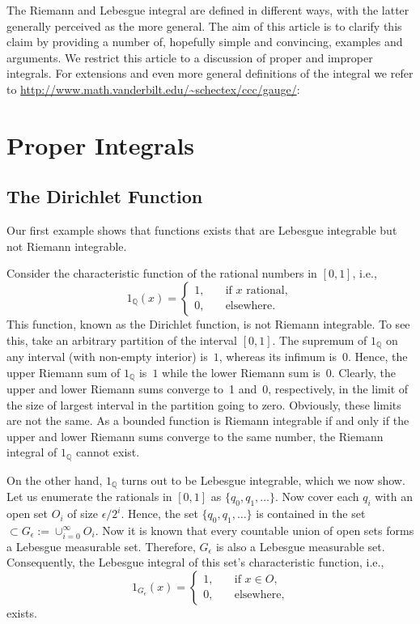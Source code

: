 \documentclass[12pt]{article}
\newcommand{\1}{{{\bf 1}}}
\begin{document}
The Riemann and Lebesgue integral are defined in different ways, with
the latter generally perceived as the more general.  The aim of 
this article is to clarify this claim by providing a number of,
hopefully simple and convincing, examples and arguments. We restrict
this article to a discussion of proper and improper integrals. For
extensions and even more general definitions of the integral we refer
to  \url{http://www.math.vanderbilt.edu/~schectex/ccc/gauge/}:

\section{Proper Integrals}
\label{sec:some-examples}

\subsection*{The Dirichlet Function}
\label{sec:example-1}
Our first example shows that functions exists that are Lebesgue
integrable but not Riemann integrable.

Consider the characteristic function of the rational numbers in
$[0,1]$, i.e.,
\begin{equation*}
  1_{\mathbb{Q}} (x) = 
  \begin{cases}
    1, &\quad \text{if $x$ rational}, \\
0, &\quad \text{elsewhere}.
  \end{cases}
\end{equation*}
This function, known as the Dirichlet function, is not Riemann
integrable.  To see this, take an arbitrary partition of the interval
$[0,1]$. The supremum of $1_{\mathbb{Q}}$ on any interval
(with non-empty interior) is~$1$, whereas its infimum is~$0$.  Hence,
the upper Riemann sum of $1_{\mathbb{Q}}$ is~$1$ while the
lower Riemann sum is~$0$.  Clearly, the upper and lower Riemann sums
converge to~1 and~0, respectively, in the limit of the size of largest
interval in the partition going to zero.  Obviously, these limits are
not the same. As a bounded function is Riemann integrable if and only
if the upper and lower Riemann sums converge to the same number, the
Riemann integral of $1_{\mathbb{Q}}$ cannot exist.

On the other hand, $1_{\mathbb{Q}}$ turns out to be
Lebesgue integrable, which we now show. Let us enumerate the rationals
in $[0,1]$ as $\{q_0, q_1, \ldots \}$. Now cover each $q_i$ with an
open set $O_i$ of size $\epsilon/2^i$.  Hence, the set
$\{q_0,q_1,\ldots\}$ is contained in the set $\subset G_\epsilon :=
\cup_{i=0}^\infty O_i$.  Now it is known that every countable union of
open sets forms a Lebesgue measurable set. Therefore, $G_\epsilon$ is
also a Lebesgue measurable set.  Consequently, the Lebesgue integral
of this set's characteristic function, i.e.,
\begin{equation*}
  1_{G_\epsilon}(x) =
  \begin{cases}
    1, &\quad\text{if } x \in O, \\
    0, &\quad\text{elsewhere},
  \end{cases}
\end{equation*}
exists. 
\end{document}
